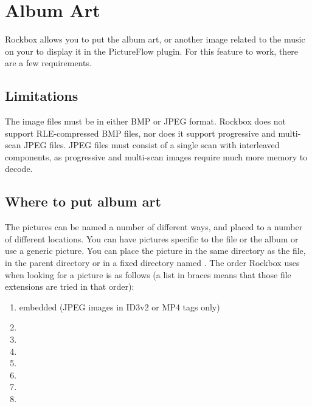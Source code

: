 \chapter{\label{ref:album_art}Album Art}
Rockbox allows you to put the album art, or another image related to the music
on your \dap{} to display it in the PictureFlow plugin. For this feature to work, there are a few requirements.

\section{Limitations}

%
%
The image files must be in either BMP or JPEG format.
Rockbox does not support RLE-compressed BMP files, nor does it
support progressive and multi-scan JPEG files.
JPEG files must consist of a single scan with interleaved components, 
as progressive and multi-scan images require much more memory to decode.

\section{Where to put album art}

The pictures can be named a number of different ways, and placed to a number of
different locations. You can have pictures specific to the file or the album
or use a generic picture. You can place the picture in the same directory
as the file, in the parent directory or in a fixed directory named
. The order Rockbox uses when looking for a picture
is as follows (a list in braces means that those file extensions are tried in
that order):

\begin{enumerate}
\item  embedded (JPEG images in ID3v2 or MP4 tags only)
\item  {}
\item  {}
\item  {}
\item  {}
\item  {}
\item  {}
\item  {}
\end{enumerate}

